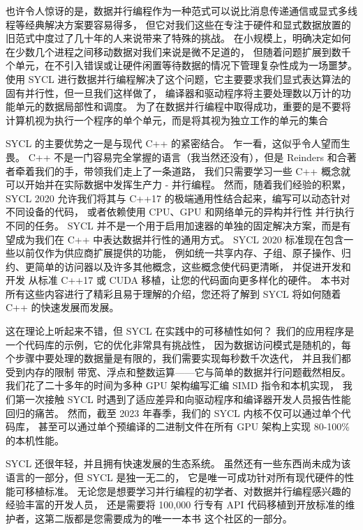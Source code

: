也许令人惊讶的是，数据并行编程作为一种范式可以说比消息传递通信或显式多线程等经典解决方案要容易得多，
但它对我们这些在专注于硬件和显式数据放置的旧范式中度过了几十年的人来说带来了特殊的挑战。
在小规模上，明确决定如何在少数几个进程之间移动数据对我们来说是微不足道的，
但随着问题扩展到数千个单元，在不引入错误或让硬件闲置等待数据的情况下管理复杂性成为一场噩梦。
使用 SYCL 进行数据并行编程解决了这个问题，它主要要求我们显式表达算法的固有并行性，但一旦我们这样做了，
编译器和驱动程序将主要处理数以万计的功能单元的数据局部性和调度。
为了在数据并行编程中取得成功，重要的是不要将计算机视为执行一个程序的单个单元，而是将其视为独立工作的单元的集合

SYCL 的主要优势之一是与现代 C++ 的紧密结合。 乍一看，这似乎令人望而生畏。 
C++ 不是一门容易完全掌握的语言（我当然还没有），但是 Reinders 和合著者牵着我们的手，带领我们走上了一条道路，
我们只需要学习一些 C++ 概念就可以开始并在实际数据中发挥生产力 - 并行编程。 
然而，随着我们经验的积累，SYCL 2020 允许我们将其与 C++17 的极端通用性结合起来，编写可以动态针对不同设备的代码，
或者依赖使用 CPU、GPU 和网络单元的异构并行性 并行执行不同的任务。 
SYCL 并不是一个用于启用加速器的单独的固定解决方案，而是有望成为我们在 C++ 中表达数据并行性的通用方式。 
SYCL 2020 标准现在包含一些以前仅作为供应商扩展提供的功能，
例如统一共享内存、子组、原子操作、归约、更简单的访问器以及许多其他概念，这些概念使代码更清晰，
并促进开发和开发 从标准 C++17 或 CUDA 移植，让您的代码面向更多样化的硬件。 
本书对所有这些内容进行了精彩且易于理解的介绍，您还将了解到 SYCL 将如何随着 C++ 的快速发展而发展。

这在理论上听起来不错，但 SYCL 在实践中的可移植性如何？ 我们的应用程序是一个代码库的示例，它的优化非常具有挑战性，
因为数据访问模式是随机的，每个步骤中要处理的数据量是有限的，我们需要实现每秒数千次迭代，
并且我们都受到内存的限制 带宽、浮点和整数运算——它与简单的数据并行问题截然相反。 
我们花了二十多年的时间为多种 GPU 架构编写汇编 SIMD 指令和本机实现，
我们第一次接触 SYCL 时遇到了适应差异和向驱动程序和编译器开发人员报告性能回归的痛苦。 
然而，截至 2023 年春季，我们的 SYCL 内核不仅可以通过单个代码库，
甚至可以通过单个预编译的二进制文件在所有 GPU 架构上实现 80-100\% 的本机性能。

SYCL 还很年轻，并且拥有快速发展的生态系统。 虽然还有一些东西尚未成为该语言的一部分，但 SYCL 是独一无二的，
它是唯一可成功针对所有现代硬件的性能可移植标准。 
无论您是想要学习并行编程的初学者、对数据并行编程感兴趣的经验丰富的开发人员，
还是需要将 100,000 行专有 API 代码移植到开放标准的维护者，这第二版都是您需要成为的唯一一本书 这个社区的一部分。